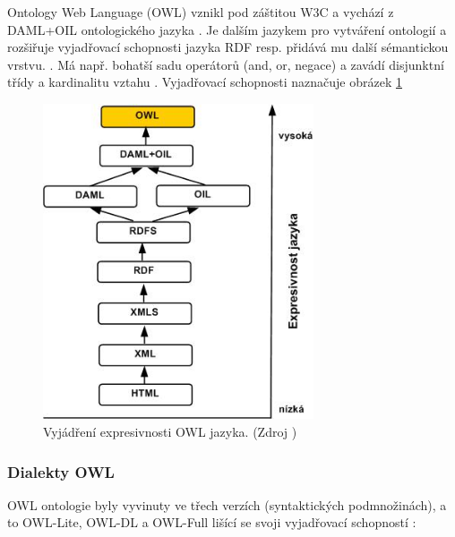     Ontology Web Language (OWL) vznikl pod záštitou W3C a vychází z DAML+OIL ontologického jazyka \cite{owlguide}.
    Je dalším jazykem pro vytváření ontologií a rozšiřuje vyjadřovací schopnosti jazyka RDF resp. přidává mu další sémantickou vrstvu. \cite{semWebStandards}.
    Má např. bohatší sadu operátorů (and, or, negace) \cite{owltutorial}a zavádí disjunktní třídy a kardinalitu vztahu \cite{staab}. 
    Vyjadřovací schopnosti naznačuje obrázek \ref{img:owlexpressiveness}
    
    \begin{figure}[h]
    \begin{center}
    \includegraphics[width=8cm]{figures/owlexpressiveness}
    \caption{Vyjádření expresivnosti OWL jazyka. (Zdroj \cite{owlhradec})}
    \label{img:owlexpressiveness}
    \end{center}
    \end{figure}
        
        \subsubsection{Dialekty OWL}
        
            OWL ontologie byly vyvinuty ve třech verzích (syntaktických podmnožinách), a to OWL-Lite, OWL-DL a OWL-Full lišící se svoji vyjadřovací schopností \cite{owlguide}:
            

